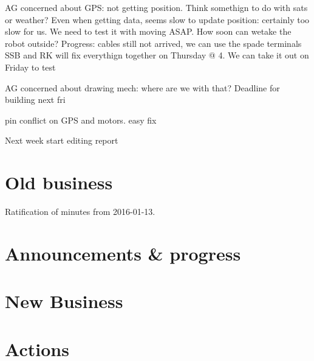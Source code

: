 \documentclass[a4paper,11pt,twoside,class=meetingmins,crop=false]{standalone}
\begin{document}

\maketitle



AG concerned about GPS: not getting position. Think somethign to do with sats or weather? Even when getting data, seems slow to update position: certainly too slow for us. We need to test it with moving ASAP. How soon can wetake the robot outside?
Progress: cables still not arrived, we can use the spade terminals
SSB and RK will fix everythign together on Thursday @ 4. We can take it out on Friday to test

AG concerned about drawing mech: where are we with that?
Deadline for building next fri

pin conflict on GPS and motors. easy fix

Next week start editing report







\section{Old business}
\begin{items}
    \item Ratification of minutes from 2016-01-13.
\end{items}
\begin{hiddenitems}
\end{hiddenitems}


\section{Announcements \& progress}
\begin{items}
    \item
\subsection{}

\end{items}


\section{New Business}
\begin{items}
\item
\end{items}

\vspace{1em}
\vspace{1em}

\section{Actions}
\begin{items}
\end{items}
\end{document}
